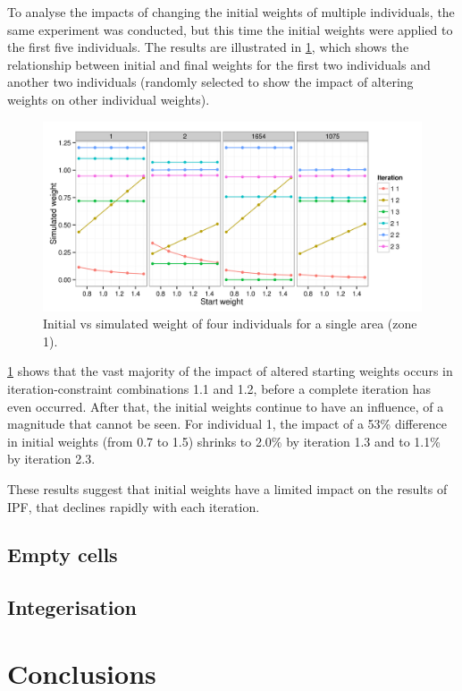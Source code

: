 \documentclass[a4paper,10pt]{article}
\begin{document}
To analyse the impacts of changing the initial weights of multiple 
individuals, the same experiment was conducted, but this time the initial weights were
applied to the first five individuals. The results are illustrated in \cref{finweight},
which shows the relationship between initial and final weights for the first two individuals
and another two individuals 
(randomly selected to show the impact of altering weights on other individual weights). 

\begin{figure}
 \begin{center}
  \includegraphics[width=12cm]{weights-exp-54nice2}
 \end{center}
\caption{Initial vs simulated weight of four individuals for a single area (zone 1).}
\label{finweight}
\end{figure}

\cref{finweight} shows that the vast majority of the impact of altered starting weights occurs in iteration-constraint
combinations 1.1 and 1.2, before a complete iteration has even occurred. 
After that, the initial weights continue to have an influence, of a magnitude that cannot be 
seen. For individual 1, the impact of a 53\% difference in initial weights (from 0.7 to 1.5) shrinks to 
2.0\% by iteration 1.3 and to 1.1\% by iteration 2.3. 

These results suggest that initial weights have a limited impact on the results of IPF, that declines rapidly with each iteration. 

\subsection{Empty cells}
\subsection{Integerisation}


\section{Conclusions}




\end{document}
